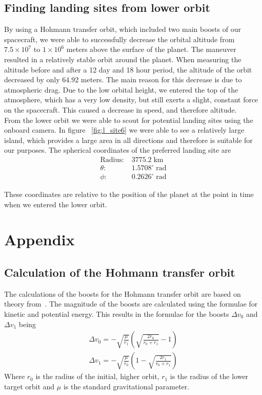 \documentclass[reprint,english,notitlepage]{revtex4-2}
\begin{document}
\subsection{Finding landing sites from lower orbit}\label{subsec:finding-landing-sites-from-lower-orbit}
    By using a Hohmann transfer orbit, which included two main boosts of our spacecraft, we were able to successfully decrease the orbital altitude from $7.5 \times 10^7$ to $1 \times 10^{6}$ meters above the surface of the planet.
    The maneuver resulted in a relatively stable orbit around the planet.
    When measuring the altitude before and after a 12 day and 18 hour period, the altitude of the orbit decreased by only $64.92$ meters.
    The main reason for this decrease is due to atmospheric drag.
    Due to the low orbital height, we entered the top of the atmosphere, which has a very low density, but still exerts a slight, constant force on the spacecraft.
    This caused a decrease in speed, and therefore altitude.\\

    From the lower orbit we were able to scout for potential landing sites using the onboard camera.
    In figure ~\ref{fig:l_site6} we were able to see a relatively large island, which provides a large area in all directions and therefore is suitable for our purposes.
    The spherical coordinates of the preferred landing site are\\
    \begin{align*}
        \text{Radius}:&\; 3775.2 \;\text{km}\\
        \theta :&\; 1.5708^{\circ} \;\text{rad}\\
        \phi :&\; 0.2626^{\circ} \;\text{rad}
    \end{align*}

    These coordinates are relative to the position of the planet at the point in time when we entered the lower orbit.

\section{Appendix} \label{sec: appendix}
\subsection{Calculation of the Hohmann transfer orbit}\label{subsec:calculation-of-the-hohmann-transfer-orbit}
    The calculations of the boosts for the Hohmann transfer orbit are based on theory from~\parencite[][]{hohmann_wiki}.
    The magnitude of the boosts are calculated using the formulae for kinetic and potential energy.
    This results in the formulae for the boosts $\Delta v_0$ and $\Delta v_1$ being
    \begin{align*}
        \Delta v_0 = -\sqrt{\frac{\mu}{r_1}} \left(\sqrt{\frac{2r_0}{r_0 + r_1}}-1\right)\\
        \Delta v_1 = -\sqrt{\frac{\mu}{r_0}} \left(1-\sqrt{\frac{2r_1}{r_0 + r_1}}\right)
    \end{align*}
    Where $r_0$ is the radius of the initial, higher orbit, $r_1$ is the radius of the lower target orbit and $\mu$ is the standard gravitational parameter.
\end{document}
